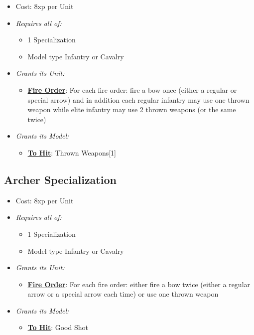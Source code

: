 \documentclass[a4paper,12pt]{article}
\begin{document}
\begin{itemize}
\item Cost: 8xp per Unit
\item \textit{Requires all of:}
\begin{itemize}
\item 1 Specialization
\item Model type Infantry or Cavalry
\end{itemize}




\item \textit{Grants its Unit:}
\begin{itemize}
\item \textbf{\hyperref[rule-special-fire-order]{Fire Order}}: For each fire order: fire a bow once (either a regular or special arrow) and in addition each regular infantry may use one thrown weapon while elite infantry may use 2 thrown weapons (or the same twice)

\end{itemize}

\item \textit{Grants its Model:}
\begin{itemize}
\item \textbf{\hyperref[rule-special-to-hit]{To Hit}}: Thrown Weapons[1]

\end{itemize}

\end{itemize}

\subsection{Archer Specialization}
\label{equipment-archer-specialization}

\begin{itemize}
\item Cost: 8xp per Unit
\item \textit{Requires all of:}
\begin{itemize}
\item 1 Specialization
\item Model type Infantry or Cavalry
\end{itemize}




\item \textit{Grants its Unit:}
\begin{itemize}
\item \textbf{\hyperref[rule-special-fire-order]{Fire Order}}: For each fire order: either fire a bow twice (either a regular arrow or a special arrow each time) or use one thrown weapon

\end{itemize}

\item \textit{Grants its Model:}
\begin{itemize}
\item \textbf{\hyperref[rule-special-to-hit]{To Hit}}: Good Shot

\end{itemize}

\end{itemize}
\end{document}
